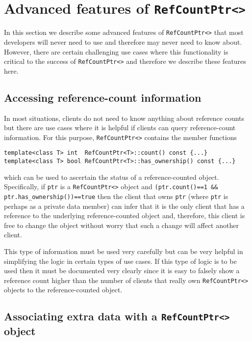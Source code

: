%
\section{Advanced features of {}\texttt{RefCountPtr<>}}
%

In this section we describe some advanced features of
{}\texttt{RefCountPtr<>} that most developers will never need to use
and therefore may never need to know about.  However, there are
certain challenging use cases where this functionality is critical to
the success of {}\texttt{RefCountPtr<>} and therefore we describe
these features here.

%
\subsection{Accessing reference-count information}
%

In most situations, clients do not need to know anything about
reference counts but there are use cases where it is helpful if
clients can query reference-count information.  For this purpose,
{}\texttt{RefCountPtr<>} contains the member functions

{\scriptsize\begin{verbatim}
template<class T> int  RefCountPtr<T>::count() const {...}
template<class T> bool RefCountPtr<T>::has_ownership() const {...}
\end{verbatim}}

{}\noindent{}which can be used to ascertain the status of a
reference-counted object.  Specifically, if {}\texttt{ptr} is a
{}\texttt{RefCountPtr<>} object and {}\texttt{(ptr.count()==1 \&\&
ptr.has\_ownership())==true} then the client that owns {}\texttt{ptr}
(where {}\texttt{ptr} is perhaps as a private data member) can infer
that it is the only client that has a reference to the underlying
reference-counted object and, therefore, this client is free to change
the object without worry that such a change will affect another
client.

This type of information must be used very carefully but can be very
helpful in simplifying the logic in certain types of use cases. If
this type of logic is to be used then it must be documented very
clearly since it is easy to falsely show a reference count higher than
the number of clients that really own {}\texttt{RefCountPtr<>} objects
to the reference-counted object.

%
\subsection{Associating extra data with a {}\texttt{RefCountPtr<>} object}
\label{rcp:sec:extra-data}
%

